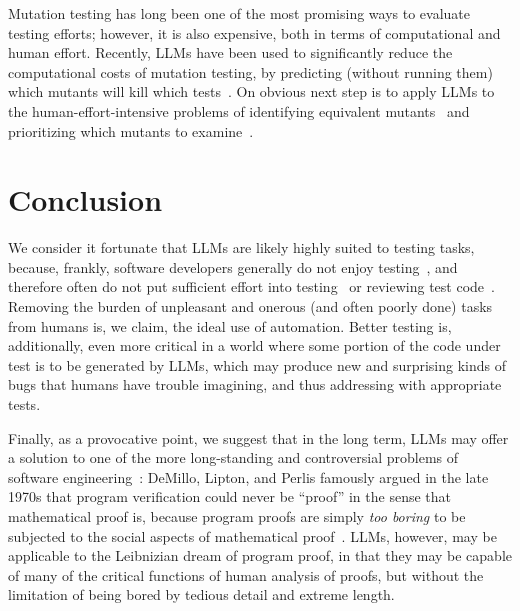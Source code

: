 \documentclass[sigconf,natbib=false]{acmart}
\begin{document}
Mutation testing has long been one of the most promising ways to
evaluate testing efforts; however, it is also expensive, both in terms
of computational and human effort.  Recently, LLMs have been used to
significantly reduce the computational costs of mutation testing, by
predicting (without running them) which mutants will kill which
tests~\cite{ContextPMT}.  On obvious next step is to apply LLMs to the
human-effort-intensive problems of identifying equivalent
mutants~\cite{TCE} and prioritizing which mutants to examine~\cite{StatMut}.

\section{Conclusion}

We consider it fortunate that LLMs are likely highly suited to testing
tasks, because, frankly, software developers generally do not enjoy
testing~\cite{DevsHateTesting}, and therefore often do not put sufficient effort into
testing~\cite{DevsDontTestEnough} or reviewing test code~\cite{TestCodeReview}.  Removing the burden of unpleasant and onerous (and often
poorly done) tasks from humans is, we claim, the ideal use of
automation.  Better testing is, additionally, even more critical in a
world where some portion of the code under test is to be generated by
LLMs, which may produce new and surprising kinds of bugs that humans
have trouble imagining, and thus addressing with appropriate tests.

Finally, as a provocative point, we suggest that in the long term,
LLMs may offer a solution to one of the more long-standing and
controversial problems of software engineering~\cite{mackenzie2004mechanizing}:
DeMillo, Lipton, and Perlis famously argued in the late 1970s that
program verification could never be ``proof'' in the sense that
mathematical proof is, because program proofs are simply \emph{too boring} to
be subjected to the social aspects of mathematical
proof~\cite{de1979social}.  LLMs, however, may be applicable to the Leibnizian
dream of program proof, in that they may be capable of many of the
critical functions of human analysis of proofs, but without the limitation of being
bored by tedious detail and extreme length.




\end{document}
